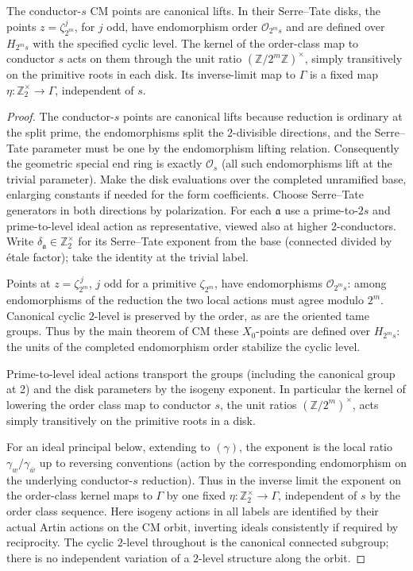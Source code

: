 \begin{lemma}
\label{split-measures:cm-coordinates}
The conductor-\(s\) CM points are canonical lifts.  In their Serre--Tate
disks, the points \(z=\zeta_{2^m}^j\), for \(j\) odd, have endomorphism
order \(\mathcal O_{2^ms}\) and are defined over \(H_{2^ms}\) with the
specified cyclic level.  The kernel of the order-class map to conductor
\(s\) acts on them through the unit ratio
\((\mathbb Z/2^m\mathbb Z)^\times\), simply transitively on the primitive
roots in each disk.  Its inverse-limit map to \(\Gamma\) is a fixed map
\(\eta:\mathbb Z_2^\times\to\Gamma\), independent of \(s\).
\end{lemma}
\begin{proof}
The conductor-\(s\) points are canonical lifts because reduction is ordinary at the split prime, the endomorphisms split the \(2\)-divisible directions, and the Serre--Tate parameter must be one by the endomorphism lifting relation. Consequently the geometric special end ring is exactly \(\mathcal O_s\) (all such endomorphisms lift at the trivial parameter). Make the disk evaluations over the completed unramified base, enlarging constants if needed for the form coefficients. Choose Serre--Tate generators in both directions by polarization. For each \(\mathfrak a\) use a prime-to-\(2s\) and prime-to-level ideal action as representative, viewed also at higher 2-conductors. Write \(\delta_{\mathfrak a}\in\mathbb Z_2^\times\) for its Serre--Tate exponent from the base (connected divided by étale factor); take the identity at the trivial label.

Points at \(z=\zeta_{2^m}^{\,j}\), \(j\) odd for a primitive \(\zeta_{2^m}\), have endomorphisms \(\mathcal O_{2^m s}\): among endomorphisms of the reduction the two local actions must agree modulo \(2^m\). Canonical cyclic \(2\)-level is preserved by the order, as are the oriented tame groups. Thus by the main theorem of CM these \(X_0\)-points are defined over \(H_{2^m s}\): the units of the completed endomorphism order stabilize the cyclic level. 

Prime-to-level ideal actions transport the groups (including the canonical group at 2) and the disk parameters by the isogeny exponent. In particular the kernel of lowering the order class map to conductor \(s\), the unit ratios \((\mathbb Z/2^m)^\times\), acts simply transitively on the primitive roots in a disk. 

For an ideal principal below, extending to \((\gamma)\), the exponent is the local ratio \(\gamma_w/\gamma_{\bar w}\) up to reversing conventions (action by the corresponding endomorphism on the underlying conductor-\(s\) reduction). Thus in the inverse limit the exponent on the order-class kernel maps to \(\Gamma\) by one fixed \(\eta:\mathbb Z_2^\times\to\Gamma\), independent of \(s\) by the order class sequence. Here isogeny actions in all labels are identified by their actual Artin actions on the CM orbit, inverting ideals consistently if required by reciprocity. The cyclic \(2\)-level throughout is the canonical connected subgroup;
there is no independent variation of a \(2\)-level structure along the
orbit.
\end{proof}

